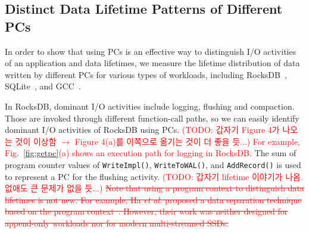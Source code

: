 \subsection{Distinct Data Lifetime Patterns of Different PCs}

In order to show that using PCs is an effective way to distinguish I/O
activities of an application and data lifetimes, we measure the lifetime
distribution of data written by different PCs for various types of workloads,
including RocksDB~\cite{}, SQLite~\cite{}, and GCC~\cite{}.

In RocksDB, dominant I/O activities include logging, flushing and compaction.
Those are invoked through different function-call paths, so we can easily
identify dominant I/O activities of RocksDB using PCs.  \textcolor{red}{(TODO:
갑자기 Figure 4가 나오는 것이 이상함 $\rightarrow$ Figure 4(a)를 이쪽으로 옮기는
것이 더 좋을 듯...) For example, Fig.~\ref{fig:getpc}(a) shows an execution
path for logging in RocksDB}.  The sum of program counter values of
\texttt{WriteImpl()}, \texttt{WriteToWAL()}, and \texttt{AddRecord()} is used
to represent a PC for the flushing activity. \textcolor{red}{(TODO: 갑자기
lifetime 이야기가 나옴. 없애도 큰 문제가 없을 듯...) \sout{Note that using a
program context to distinguish data lifetimes is not new. For example, Ha {\it
et al.} proposed a data separation technique based on the program
context~\cite{PCHa}.  However, their work was neither designed for append-only
workloads nor for modern multi-streamed SSDs.}}

